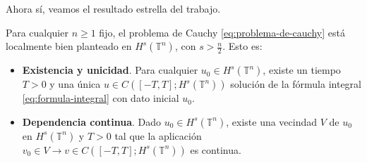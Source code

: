     Ahora sí, veamos el resultado estrella del trabajo.
    \begin{theorem}
        Para cualquier $n \geq 1$ fijo, el problema de Cauchy \textcolor{red}{\ref{eq:problema-de-cauchy}} está localmente bien planteado en $H^s(\mathbb{T}^n)$, con $s > \frac{n}{2}$. Esto es:
        \begin{itemize}
            \item \textbf{Existencia y unicidad}. Para cualquier $u_0 \in H^s(\mathbb{T}^n)$, existe un tiempo $T > 0$ y una única $u \in C([-T, T]; H^s(\mathbb{T}^n))$ solución de la fórmula integral \textcolor{red}{\ref{eq:formula-integral}} con dato inicial $u_0$.
            \item \textbf{Dependencia continua}. Dado $u_0 \in H^s(\mathbb{T}^n)$, existe una vecindad $V$ de $u_0$ en $H^s(\mathbb{T}^n)$ y $T > 0$ tal que la aplicación $v_0 \in V \to v \in C([-T, T]; H^s(\mathbb{T}^n))$ es continua.
        \end{itemize}
    \end{theorem}
